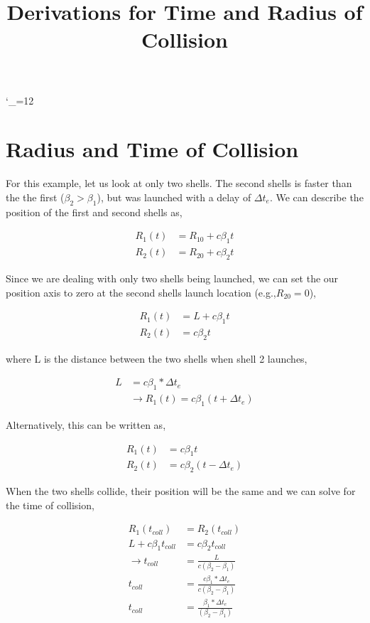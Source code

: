 \documentclass[10pt]{article}
\title{Derivations for Time and Radius of Collision}
\def\upsubscripts{\catcode`\_=12 } \def\normalsubscripts{\catcode`\_=8 }
\begin{document}
\upsubscripts

\section*{Radius and Time of Collision}

For this example, let us look at only two shells. The second shells is faster than the the first ($\beta_2 > \beta_1$), but was launched with a delay of $\Delta t_e$. We can describe the position of the first and second shells as,

\begin{align}
	R_1(t) &= R_{10} + c \beta_1 t \\
	R_2(t) &= R_{20} + c \beta_2 t
\end{align}

Since we are dealing with only two shells being launched, we can set the our position axis to zero at the second shells launch location (e.g.,$R_{20} = 0$), 

\begin{align}
	R_1(t) &= L + c \beta_1 t \\
	R_2(t) &= c \beta_2 t
\end{align}

where L is the distance between the two shells when shell 2 launches,

\begin{align}
	L &= c\beta_1*\Delta t_e\\
	&\rightarrow R_1(t) = c \beta_1 (t + \Delta t_e)
\end{align}

Alternatively, this can be written as,

\begin{align}
	R_1(t) &= c \beta_1 t \\
	R_2(t) &= c \beta_2 (t-\Delta t_e)
\end{align}

When the two shells collide, their position will be the same and we can solve for the time of collision,

\begin{align}
	R_1(t_{coll}) &= R_2(t_{coll})\\
	L + c\beta_1 t_{coll} &= c \beta_2 t_{coll}\\
	\rightarrow t_{coll} &= \frac{L}{c(\beta_2 - \beta_1)}\\
	t_{coll} &= \frac{c\beta_1*\Delta t_e}{c(\beta_2 - \beta_1)}\\
	t_{coll} &= \frac{\beta_1*\Delta t_e}{(\beta_2 - \beta_1)}
\end{align}
\end{document}
